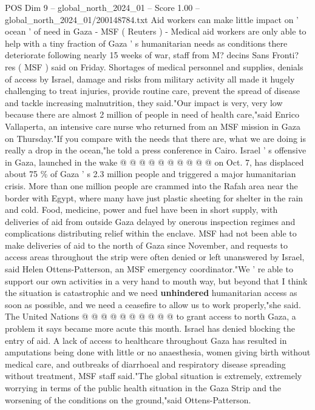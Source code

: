 \begin{textsample}{POS Dim 9 – global\_north\_2024\_01 – Score 1.00 – global\_north\_2024\_01/200148784.txt}  \label{ex:f9_pos_261}
Aid workers can make little impact on ' ocean ' of need in Gaza - MSF ( Reuters ) - Medical aid workers are only able to help with a tiny fraction of Gaza ' s humanitarian needs as conditions there deteriorate following nearly 15 weeks of war, staff from M? decins Sans Fronti? res ( MSF ) said on Friday.
Shortages of medical personnel and supplies, denials of access by Israel, damage and risks from military activity all made it hugely challenging to treat injuries, provide routine care, prevent the spread of disease and tackle increasing malnutrition, they said."Our impact is very, very low because there are almost 2 million of people in need of health care,"said Enrico Vallaperta, an intensive care nurse who returned from an MSF mission in Gaza on Thursday."If you compare with the needs that there are, what we are doing is really a drop in the ocean,"he told a press conference in Cairo.
Israel ' s offensive in Gaza, launched in the wake @ @ @ @ @ @ @ @ @ @ on Oct. 7, has displaced about 75 \% of Gaza ' s 2.3 million people and triggered a major humanitarian crisis.
More than one million people are crammed into the Rafah area near the border with Egypt, where many have just plastic sheeting for shelter in the rain and cold.
Food, medicine, power and fuel have been in short supply, with deliveries of aid from outside Gaza delayed by onerous inspection regimes and complications distributing relief within the enclave.
MSF had not been able to make deliveries of aid to the north of Gaza since November, and requests to access areas throughout the strip were often denied or left unanswered by Israel, said Helen Ottens-Patterson, an MSF emergency coordinator."We ' re able to support our own activities in a very hand to mouth way, but beyond that I think the situation is catastrophic and we need \textbf{unhindered} humanitarian access as soon as possible, and we need a ceasefire to allow us to work properly,"she said.
The United Nations @ @ @ @ @ @ @ @ @ @ to grant access to north Gaza, a problem it says became more acute this month.
Israel has denied blocking the entry of aid.
A lack of access to healthcare throughout Gaza has resulted in amputations being done with little or no anaesthesia, women giving birth without medical care, and outbreaks of diarrhoeal and respiratory disease spreading without treatment, MSF staff said."The global situation is extremely, extremely worrying in terms of the public health situation in the Gaza Strip and the worsening of the conditions on the ground,"said Ottens-Patterson.

\end{textsample}
